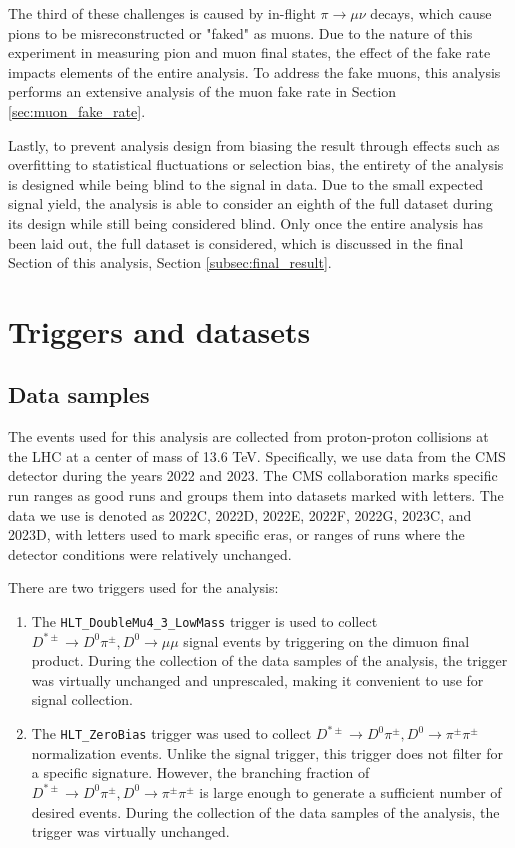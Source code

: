 The third of these challenges is caused by in-flight $\pi \to \mu \nu$ decays, which cause pions to be misreconstructed or "faked" as muons. Due to the nature of this experiment in measuring pion and muon final states, the effect of the fake rate impacts elements of the entire analysis. To address the fake muons, this analysis performs an extensive analysis of the muon fake rate in Section \ref{sec:muon_fake_rate}. 

Lastly, to prevent analysis design from biasing the result through effects such as overfitting to statistical fluctuations or selection bias, the entirety of the analysis is designed while being blind to the signal in data. Due to the small expected signal yield, the analysis is able to consider an eighth of the full dataset during its design while still being considered blind. Only once the entire analysis has been laid out, the full dataset is considered, which is discussed in the final Section of this analysis, Section \ref{subsec:final_result}. 

\section{Triggers and datasets}
\label{sec:triggers_and_datasets}

\subsection{Data samples}

\label{subsec:data_samples}

The events used for this analysis are collected from proton-proton collisions at the LHC at a center of mass of 13.6 TeV. Specifically, we use data from the CMS detector during the years 2022 and 2023. The CMS collaboration marks specific run ranges as good runs and groups them into datasets marked with letters. The data we use is denoted as 2022C, 2022D, 2022E, 2022F, 2022G, 2023C, and 2023D, with letters used to mark specific eras, or ranges of runs where the detector conditions were relatively unchanged. 

There are two triggers used for the analysis:
\begin{enumerate}
    \item The \texttt{HLT\_DoubleMu4\_3\_LowMass} trigger is used to collect $D^{*\pm} \to D^0 \pi^\pm, D^0 \to \mu \mu$ signal events by triggering on the dimuon final product. During the collection of the data samples of the analysis, the trigger was virtually unchanged and unprescaled, making it convenient to use for signal collection.
    \item The \texttt{HLT\_ZeroBias} trigger was used to collect $D^{*\pm} \to D^0 \pi^\pm, D^0 \to \pi^\pm \pi^\pm$ normalization events. Unlike the signal trigger, this trigger does not filter for a specific signature. However, the branching fraction of $D^{*\pm} \to D^0 \pi^\pm, D^0 \to \pi^\pm \pi^\pm$ is large enough to generate a sufficient number of desired events. During the collection of the data samples of the analysis, the trigger was virtually unchanged.
\end{enumerate}

